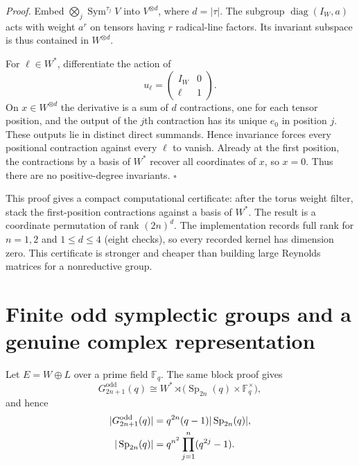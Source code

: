 \documentclass[11pt]{article}
\newcommand{\Sym}{\operatorname{Sym}}
\newcommand{\Sp}{\operatorname{Sp}}
\begin{document}
\textit{Proof.}
Embed $\bigotimes_j\Sym^{\tau_j}V$ into $V^{\otimes d}$, where
$d=|\tau|$. The subgroup $\operatorname{diag}(I_W,a)$ acts with weight $a^r$
on tensors having $r$ radical-line factors. Its invariant subspace is thus
contained in $W^{\otimes d}$.

For $\ell\in W^*$, differentiate the action of
\[
 u_\ell=\begin{pmatrix}I_W&0\\ \ell&1\end{pmatrix}.
\]
On $x\in W^{\otimes d}$ the derivative is a sum of $d$ contractions, one for
each tensor position, and the output of the $j$th contraction has its unique
$e_0$ in position $j$. These outputs lie in distinct direct summands. Hence
invariance forces every positional contraction against every $\ell$ to vanish.
Already at the first position, the contractions by a basis of $W^*$ recover
all coordinates of $x$, so $x=0$. Thus there are no positive-degree
invariants. \hfill$\square$

This proof gives a compact computational certificate: after the torus weight
filter, stack the first-position contractions against a basis of $W^*$. The
result is a coordinate permutation of rank $(2n)^d$. The implementation records
full rank for $n=1,2$ and $1\le d\le4$ (eight checks), so every recorded kernel
has dimension zero. This certificate is stronger and cheaper than building
large Reynolds matrices for a nonreductive group.

\section{Finite odd symplectic groups and a genuine complex representation}
\label{sec:finite}

Let $E=W\oplus L$ over a prime field $\mathbb F_q$. The same block proof gives
\begin{equation}
 G^{\mathrm{odd}}_{2n+1}(q)
 \cong W^*\rtimes\bigl(\Sp_{2n}(q)\times\mathbb F_q^\times\bigr),
\end{equation}
and hence
\begin{align}
 |G^{\mathrm{odd}}_{2n+1}(q)|
 &=q^{2n}(q-1)|\Sp_{2n}(q)|,\notag\\
 |\Sp_{2n}(q)|&=q^{n^2}\prod_{j=1}^n(q^{2j}-1).
\end{align}
\end{document}

